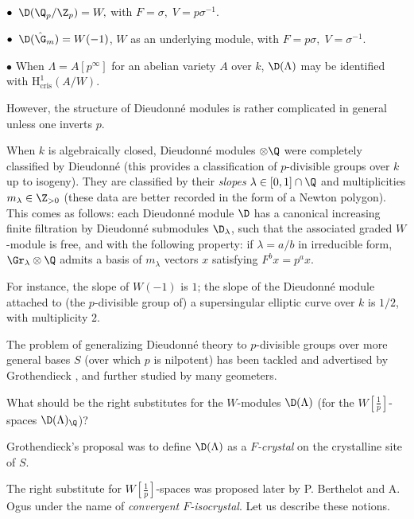 \begin{exs}
  $\bullet \;\;{\D}(\Q_p/\Z_p)=W,$ with $F=\sigma,
 \;V=p\sigma^{-1}$. 
 \par\noindent $\bullet\;\; {\D}(\hat\G_m)=W(-1)$, \ie $W$ as an
 underlying module, with $F=p\sigma, 
 \;V=\sigma^{-1}$.
 \par\noindent $\bullet$ When
 $\Lambda=A[p^\infty]$ for an abelian variety $A$ over $k$,
 ${\D}(\Lambda)$ may be identified with 
 $\mathrm{H}^1_{\mathrm{cris}}(A/W)$. 
\end{exs}

 However, the structure of Dieudonn\'e modules is rather complicated in
 general unless one inverts $p$. 

\begin{para}\label{para:3.1.2}
 When $k$ is algebraically closed, Dieudonn\'e modules $\otimes \Q$ were
 completely classified by Dieudonn\'e (this provides a classification of
 $p$-divisible groups over $k$ up to isogeny). They are classified by
 their {\it slopes} $\lambda\in [0,1]\cap \Q$ and multiplicities
 $m_\lambda\in \Z_{>0}$ (these data are better recorded in the form of a
 Newton polygon). This comes as follows: each Dieudonn\'e module $\D$
 has a canonical increasing finite filtration by Dieudonn\'e submodules
 $\D_\lambda$, such that the associated graded $W$-module is free, and
 with the following property: if $\lambda=a/b$ in irreducible form,
 $\Gr_\lambda\otimes \Q$ admits a basis of $m_\lambda$ vectors $x$
 satisfying $F^bx=p^ax$.


 For instance, the slope of $W(-1)$ is $1$; the slope of the Dieudonn\'e
 module attached to 
 (the $p$-divisible group of) a supersingular elliptic curve over $k$ is
 $1/2$, with multiplicity $2$.
\end{para}

\begin{para}\label{para:3.1.3} The problem of generalizing Dieudonn\'e
 theory to $p$-divisible groups over more general bases $S$ (over which
$p$ is nilpotent) has been tackled and advertised by Grothendieck
 \cite{grothendieck74:_group_barsot_tate_dieud}, and further studied by many geometers.


 What should be the right substitutes for the $W$-modules ${\D}(\Lambda)$
 (\resp for the $W[\frac{1}{p}]$-spaces ${\D}(\Lambda)_{\Q}$)?


 Grothendieck's proposal was to define ${\D}(\Lambda)$ as a {\it
 $F$-crystal} on the crystalline site of $S$. 

 The right substitute for $W[\frac{1}{p}]$-spaces was proposed later by
 P. Berthelot and A. Ogus under the name of {\it convergent
 $F$-isocrystal}. Let us describe these notions.
\end{para}


